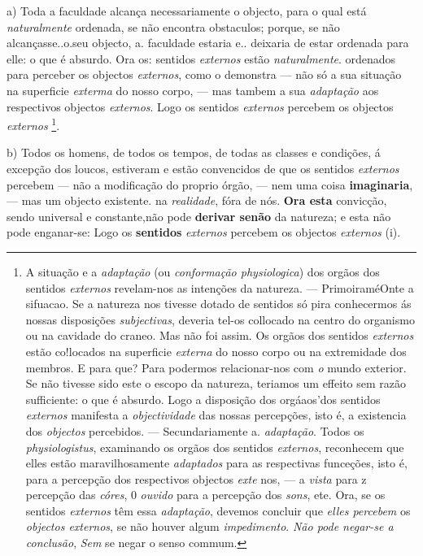 a) Toda a faculdade alcança necessariamente o objecto, para o qual está \emph{naturalmente} ordenada, se não encontra obstaculos; porque, se não alcançasse..o.seu objecto, a. faculdade estaria e.. deixaria de estar ordenada para elle: o que é absurdo. Ora os: sentidos \emph{externos} estão \emph{naturalmente}. ordenados para perceber os objectos \emph{externos}, como o demonstra --- não só a sua situação na superficie \emph{exterma} do nosso corpo, --- mas tambem a sua \emph{adaptação} aos respectivos objectos \emph{externos}. Logo os sentidos \emph{externos} percebem os objectos \emph{externos} \footnote{A situação e a \emph{adaptação} (ou \emph{conformação physiologica}) dos orgãos dos sentidos \emph{externos} revelam-nos as intenções da natureza. --- PrimoiraméOnte a sifuacao. Se a natureza nos tivesse dotado de sentidos só pira conhecermos ás nossas disposições \emph{subjectivas}, deveria tel-os collocado na centro do organismo ou na cavidade do craneo. Mas não foi assim. Os orgãos dos sentidos \emph{externos} estão co!locados na superficie \emph{externa} do nosso corpo ou na extremidade dos membros. E para que? Para podermos relacionar-nos com \emph{o} mundo exterior. Se não tivesse sido este o escopo da natureza, teriamos um effeito sem razão sufficiente: o que é absurdo. Logo a disposição dos orgáaos'dos sentidos \emph{externos} manifesta a \emph{objectividade} das nossas percepções, isto é, a existencia dos \emph{objectos} percebidos. --- Secundariamente a. \emph{adaptação}. Todos os \emph{physiologistus}, examinando os orgãos dos sentidos \emph{externos}, reconhecem que elles estão maravilhosamente \emph{adaptados} para as respectivas funceções, isto é, para a percepção dos respectivos objectos \emph{exte} nos, --- a \emph{vista} para z percepção das \emph{córes}, 0 \emph{ouvido} para a percepção dos \emph{sons}, ete. Ora, se os sentidos \emph{externos} têm essa \emph{adaptação}, devemos concluir que \emph{elles percebem} os \emph{objectos externos}, se não houver algum \emph{impedimento}. \emph{Não pode negar-se a conclusão}, \emph{Sem} se negar o senso commum.}.

b) Todos os homens, de todos os tempos, de todas as classes e condições, á excepção dos loucos, estiveram e estão convencidos de que os sentidos \emph{externos} percebem --- não a   modificação do proprio órgão, --- nem uma coisa \textbf{imaginaria}, --- mas um objecto existente. na \emph{realidade}, fóra de nós. \textbf{Ora esta} convicção, sendo universal e constante,não pode \textbf{derivar senão} da natureza; e esta não pode enganar-se: Logo os \textbf{sentidos} \emph{externos} percebem os objectos \emph{externos} (i).

